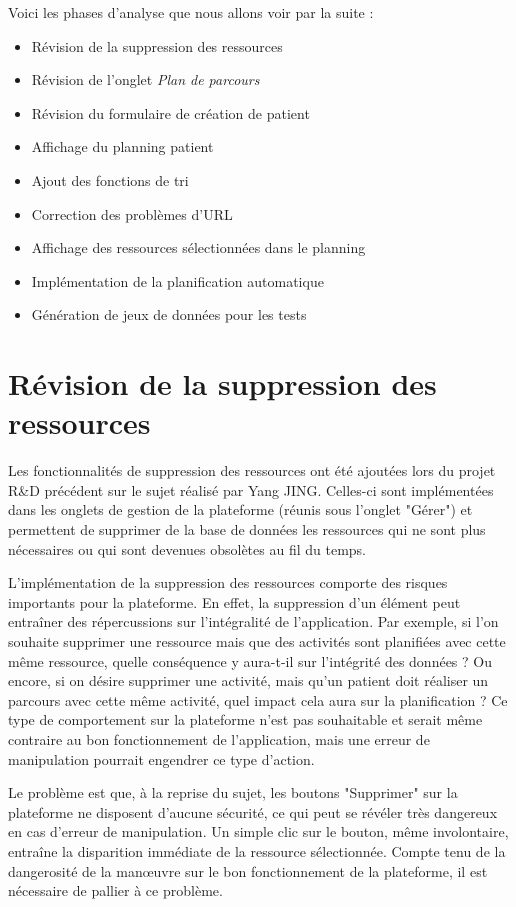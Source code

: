 \documentclass{polytech/polytech}
\begin{document}
Voici les phases d'analyse que nous allons voir par la suite : 

\begin{itemize}
	\item Révision de la suppression des ressources
	\item Révision de l'onglet \textit{Plan de parcours}
	\item Révision du formulaire de création de patient
	\item Affichage du planning patient
	\item Ajout des fonctions de tri
	\item Correction des problèmes d'URL
	\item Affichage des ressources sélectionnées dans le planning
	\item Implémentation de la planification automatique
	\item Génération de jeux de données pour les tests
\end{itemize}


\section{Révision de la suppression des ressources}

Les fonctionnalités de suppression des ressources ont été ajoutées lors du projet R\&D précédent sur le sujet réalisé par Yang JING. Celles-ci sont implémentées dans les onglets de gestion de la plateforme (réunis sous l'onglet "Gérer") et permettent de supprimer de la base de données les ressources qui ne sont plus nécessaires ou qui sont devenues obsolètes au fil du temps. 

L'implémentation de la suppression des ressources comporte des risques importants pour la plateforme. En effet, la suppression d'un élément peut entraîner des répercussions sur l'intégralité de l'application. Par exemple, si l'on souhaite supprimer une ressource mais que des activités sont planifiées avec cette même ressource, quelle conséquence y aura-t-il sur l'intégrité des données ? Ou encore, si on désire supprimer une activité, mais qu'un patient doit réaliser un parcours avec cette même activité, quel impact cela aura sur la planification ? Ce type de comportement sur la plateforme n'est pas souhaitable et serait même contraire au bon fonctionnement de l'application, mais une erreur de manipulation pourrait engendrer ce type d'action. 

Le problème est que, à la reprise du sujet, les boutons "Supprimer" sur la plateforme ne disposent d'aucune sécurité, ce qui peut se révéler très dangereux en cas d'erreur de manipulation. Un simple clic sur le bouton, même involontaire, entraîne la disparition immédiate de la ressource sélectionnée. Compte tenu de la dangerosité de la manœuvre sur le bon fonctionnement de la plateforme, il est nécessaire de pallier à ce problème. 
\end{document}
